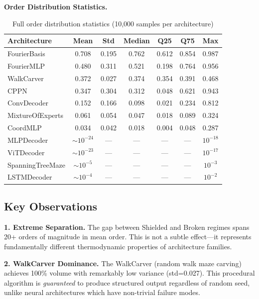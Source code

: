 \textbf{Order Distribution Statistics.}

\begin{table}[H]
\centering
\caption{Full order distribution statistics (10,000 samples per architecture)}
\label{tab:mc_order_stats}
\begin{tabular}{lcccccc}
\toprule
Architecture & Mean & Std & Median & Q25 & Q75 & Max \\
\midrule
FourierBasis & 0.708 & 0.195 & 0.762 & 0.612 & 0.854 & 0.987 \\
FourierMLP & 0.480 & 0.311 & 0.521 & 0.198 & 0.764 & 0.956 \\
WalkCarver & 0.372 & 0.027 & 0.374 & 0.354 & 0.391 & 0.468 \\
CPPN & 0.347 & 0.304 & 0.312 & 0.048 & 0.621 & 0.943 \\
ConvDecoder & 0.152 & 0.166 & 0.098 & 0.021 & 0.234 & 0.812 \\
\midrule
MixtureOfExperts & 0.061 & 0.054 & 0.047 & 0.018 & 0.089 & 0.324 \\
CoordMLP & 0.034 & 0.042 & 0.018 & 0.004 & 0.048 & 0.287 \\
\midrule
MLPDecoder & $\sim 10^{-24}$ & --- & --- & --- & --- & $10^{-18}$ \\
ViTDecoder & $\sim 10^{-23}$ & --- & --- & --- & --- & $10^{-17}$ \\
SpanningTreeMaze & $\sim 10^{-5}$ & --- & --- & --- & --- & $10^{-3}$ \\
LSTMDecoder & $\sim 10^{-4}$ & --- & --- & --- & --- & $10^{-2}$ \\
\bottomrule
\end{tabular}
\end{table}

\subsection{Key Observations}

\textbf{1. Extreme Separation.} The gap between Shielded and Broken regimes spans 20+ orders of magnitude in mean order. This is not a subtle effect---it represents fundamentally different thermodynamic properties of architecture families.

\textbf{2. WalkCarver Dominance.} The WalkCarver (random walk maze carving) achieves 100\% volume with remarkably low variance (std=0.027). This procedural algorithm is \emph{guaranteed} to produce structured output regardless of random seed, unlike neural architectures which have non-trivial failure modes.


